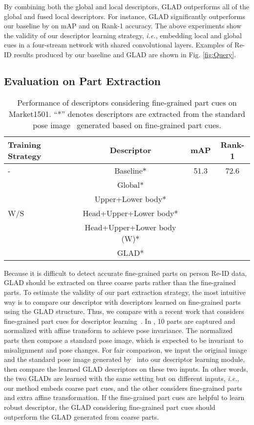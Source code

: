 \documentclass[sigconf]{acmart}
\begin{document}
By combining both the global and local descriptors, GLAD outperforms all of the global and fused local descriptors. For instance, GLAD significantly outperforms our baseline by  on mAP and  on Rank-1 accuracy. The above experiments show the validity of our descriptor learning strategy, \emph{i.e.}, embedding local and global cues in a four-stream network with shared convolutional layers. Examples of Re-ID results produced by our baseline and GLAD are shown in Fig. \ref{fig:Query}.


\subsection{ Evaluation on Part Extraction}
\label{sec:effect_of_part}

\begin{table}
\centering
\small
\caption{Performance of descriptors considering fine-grained part cues on Market1501. ``*'' denotes descriptors are extracted from the standard pose image~\cite{zheng2017pose} generated based on fine-grained part cues.}
\begin{tabular}{lccc}
\hline
 Training Strategy & Descriptor & mAP &  Rank-1\\
\hline
- & Baseline* &51.3 &72.6 \\
\hline
& Global* &   &  \\
& Upper+Lower body*   &  &  \\
W/S& Head+Upper+Lower body*    &  &  \\
& Head+Upper+Lower body (W)*     &  &  \\
& GLAD*   &  & \\
\hline
\end{tabular}
\label{tab:Fine_Grain}
\end{table}


Because it is difficult to detect accurate fine-grained parts on person Re-ID data, GLAD should be extracted on three coarse parts rather than the fine-grained parts. To estimate the validity of our part extraction strategy, the most intuitive way is to compare our descriptor with descriptors learned on fine-grained parts using the GLAD structure. Thus, we compare with a recent work that considers fine-grained part cues for descriptor learning~\cite{zheng2017pose}. In \cite{zheng2017pose}, 10 parts are captured and normalized with affine transform to achieve pose invariance. The normalized parts then compose a standard pose image, which is expected to be invariant to misalignment and pose changes. For fair comparison, we input the original image and the standard pose image generated by~\cite{zheng2017pose} into our descriptor learning module, then compare the learned GLAD descriptors on these two inputs. In other words, the two GLADs are learned with the same setting but on different inputs, \emph{i.e.}, our method embeds coarse part cues, and the other considers fine-grained parts and extra affine transformation. If the fine-grained part cues are helpful to learn robust descriptor, the GLAD considering fine-grained part cues should outperform the GLAD generated from coarse parts.
\end{document}
